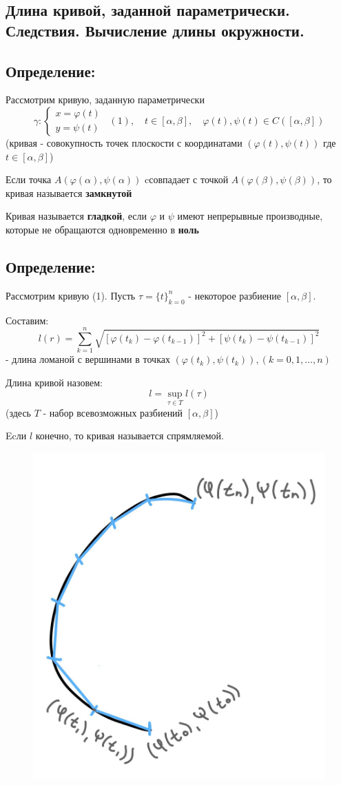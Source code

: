 {
\subsection{Длина кривой, заданной параметрически. Следствия. Вычисление длины окружности.}
\subsection*{Определение:}
Рассмотрим кривую, заданную параметрически
\[
\gamma :
\begin{cases}
x = \varphi(t) \\
y = \psi(t)
\end{cases} \, \, \,  (1), \quad
t \in [\alpha, \beta], \quad
\varphi(t), \psi(t) \in C([\alpha, \beta])
\]
(кривая - совокупность точек плоскости с координатами \( (\varphi(t), \psi(t)) \) где \(t \in [\alpha, \beta]\))

Если точка \(A (\varphi(\alpha), \psi(\alpha))\) cсовпадает с точкой \(A (\varphi(\beta), \psi(\beta))\), то кривая называется \textbf{замкнутой}

Кривая называется \textbf{гладкой}, если \(\varphi\) и \(\psi\) имеют непрерывные производные, которые не обращаются одновременно в \textbf{ноль}

\subsection*{Определение:}
Рассмотрим кривую (1). Пусть \(\tau = \{ t \}_{k=0}^n\) - некоторое разбиение \([\alpha, \beta]\).

Составим:
\[
l(r) = \sum_{k = 1}^n{\sqrt{\left[ \varphi(t_k) - \varphi(t_{k-1}) \right]^2 + \left[ \psi(t_k) - \psi(t_{k-1}) \right]^2}}
\]
- длина ломаной с вершинами в точках \( (\varphi(t_k), \psi(t_k)), (k = 0, 1, \dots, n)\)

Длина кривой назовем:
\[
l = \sup_{\tau \in T} l(\tau)
\]
(здесь \(T\) - набор всевозможных разбиений \( [\alpha, \beta] \))

Ecли \( l \) конечно, то кривая называется спрямляемой.
\begin{figure}[h!]
    \centering
    \includegraphics[width=0.4\linewidth]{source/3.png}
    \label{fig:enter-label}
\end{figure}
\newpage
}
